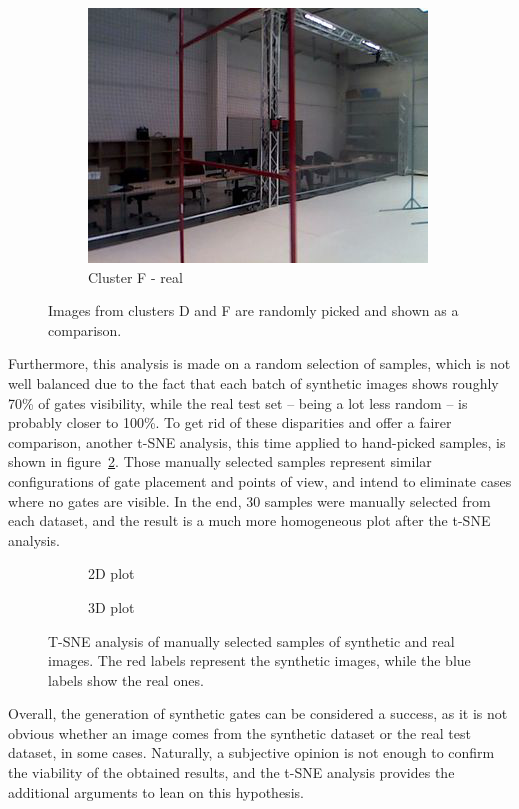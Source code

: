 \begin{figure}[h!]
\begin{subfigure}{0.29\textwidth}
      \includegraphics[width=\textwidth]{figure/tsne_random/F/6.png}
      \caption{Cluster F - real}
   \end{subfigure}
   \caption[Synthetic versus real images comparison]{Images from clusters D and
   F are randomly picked and shown as a comparison.}
   \label{fig:clustering}
\end{figure}

Furthermore, this analysis is made on a random selection of samples, which is
not well balanced due to the fact that each batch of synthetic images shows
roughly 70\% of gates visibility, while the real test set -- being a lot less
random -- is probably closer to 100\%. To get rid of these disparities and
offer a fairer comparison, another t-SNE analysis, this time applied to
hand-picked samples, is shown in figure~\ref{fig:tsne-manual}. Those manually
selected samples represent similar configurations of gate placement and
points of view, and intend to eliminate cases where no gates are visible. In
the end, 30 samples were manually selected from each dataset, and the result is
a much more homogeneous plot after the t-SNE analysis.

\begin{figure}[h!]
	\centering
	\begin{subfigure}[h]{0.49\textwidth}
		\scalebox{0.4}{
			
		}
		\caption{2D plot}
	\end{subfigure}
	\begin{subfigure}[h]{0.49\textwidth}
		\scalebox{0.4}{
			
		}
		\caption{3D plot}
	\end{subfigure}
	\caption[T-SNE analysis of hand-picked samples.]{T-SNE analysis of
	manually selected samples of synthetic and real images. The red labels
	represent the synthetic images, while the blue labels show the real ones.}
	\label{fig:tsne-manual}
\end{figure}

Overall, the generation of synthetic gates can be considered a success, as
it is not obvious whether an image comes from the synthetic dataset or the real
test dataset, in some cases. Naturally, a subjective opinion is not enough to
confirm the viability of the obtained results, and the t-SNE analysis provides
the additional arguments to lean on this hypothesis.
\clearpage
